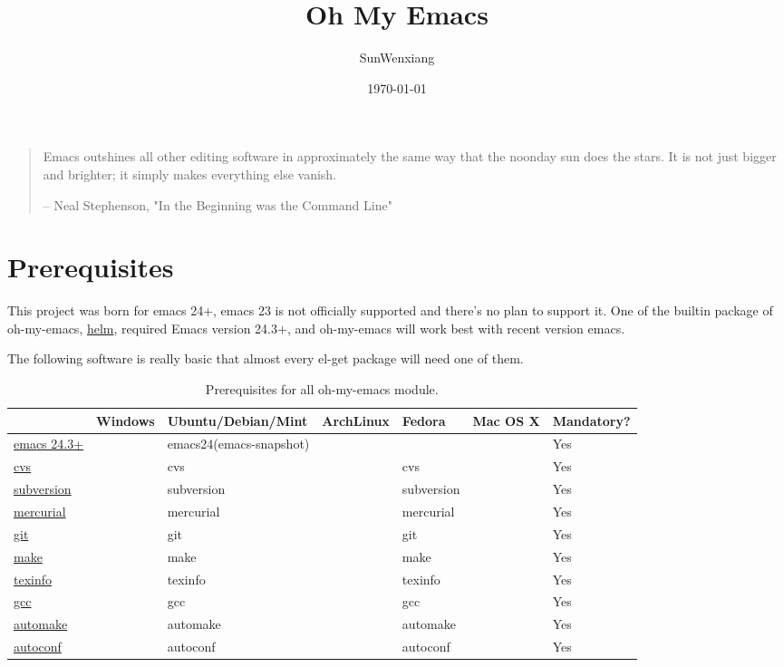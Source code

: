 \documentclass[11pt]{article}
\author{SunWenxiang}
\date{\today}
\title{Oh My Emacs}
\begin{document}
\maketitle
\setcounter{tocdepth}{2}
\tableofcontents

\begin{quote}
Emacs outshines all other editing software in approximately the same
way that the noonday sun does the stars. It is not just bigger and
brighter; it simply makes everything else vanish.

-- Neal Stephenson, "In the Beginning was the Command Line"
\end{quote}

\section*{Prerequisites}
\label{sec-1}
This project was born for emacs 24+, emacs 23 is not officially supported and
there's no plan to support it. One of the builtin package of oh-my-emacs, \href{https://github.com/emacs-helm/helm}{helm},
required Emacs version 24.3+, and oh-my-emacs will work best with recent
version emacs.

The following software is really basic that almost every el-get package will
need one of them.

\begin{table}[htb]
\caption{\label{ome-prerequisites}Prerequisites for all oh-my-emacs module.}
\centering
\begin{tabular}{lllllll}
 & Windows & Ubuntu/Debian/Mint & ArchLinux & Fedora & Mac OS X & Mandatory?\\
\hline
\href{https://www.gnu.org/software/emacs/}{emacs 24.3+} &  & emacs24(emacs-snapshot) &  &  &  & Yes\\
\href{http://savannah.nongnu.org/projects/cvs}{cvs} &  & cvs &  & cvs &  & Yes\\
\href{http://subversion.apache.org/}{subversion} &  & subversion &  & subversion &  & Yes\\
\href{http://mercurial.selenic.com/}{mercurial} &  & mercurial &  & mercurial &  & Yes\\
\href{http://git-scm.com/}{git} &  & git &  & git &  & Yes\\
\href{http://www.gnu.org/software/make/}{make} &  & make &  & make &  & Yes\\
\href{http://www.gnu.org/software/texinfo/}{texinfo} &  & texinfo &  & texinfo &  & Yes\\
\href{http://gcc.gnu.org/}{gcc} &  & gcc &  & gcc &  & Yes\\
\href{http://www.gnu.org/software/automake/}{automake} &  & automake &  & automake &  & Yes\\
\href{http://www.gnu.org/software/autoconf/}{autoconf} &  & autoconf &  & autoconf &  & Yes\\
\end{tabular}
\end{table}
\end{document}
